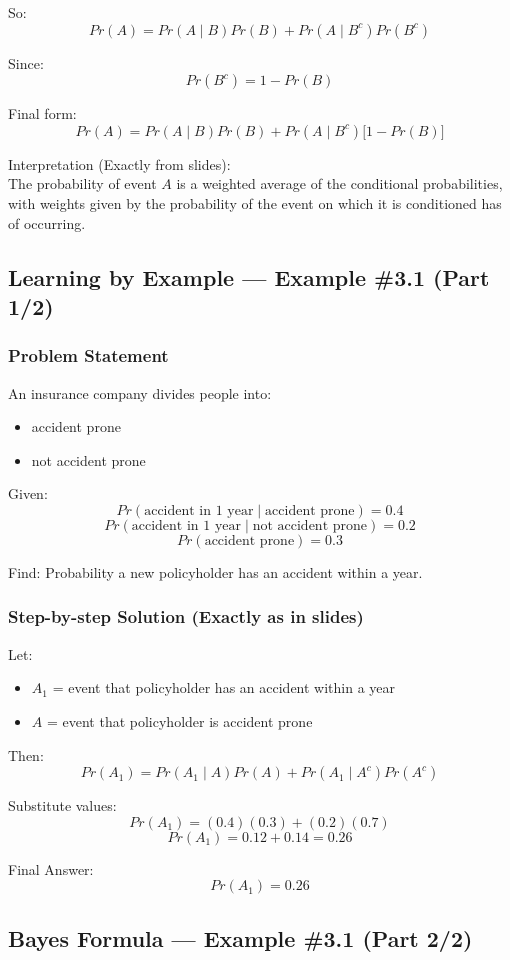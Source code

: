 \documentclass{article}
\begin{document}
So:
\[
Pr(A)=Pr(A\mid B)Pr(B)+Pr(A\mid B^c)Pr(B^c)
\]

Since:
\[
Pr(B^c)=1-Pr(B)
\]

Final form:
\[
Pr(A)=Pr(A\mid B)Pr(B)+Pr(A\mid B^c)\big[1-Pr(B)\big]
\]

Interpretation (Exactly from slides):\\
The probability of event $A$ is a weighted average of the conditional probabilities,
with weights given by the probability of the event on which it is conditioned has of occurring.

\subsection{Learning by Example --- Example \#3.1 (Part 1/2)}

\subsubsection*{Problem Statement}
An insurance company divides people into:
\begin{itemize}
\item accident prone
\item not accident prone
\end{itemize}

Given:
\[
Pr(\text{accident in 1 year}\mid \text{accident prone})=0.4
\]
\[
Pr(\text{accident in 1 year}\mid \text{not accident prone})=0.2
\]
\[
Pr(\text{accident prone})=0.3
\]

Find: Probability a new policyholder has an accident within a year.

\subsubsection*{Step-by-step Solution (Exactly as in slides)}
Let:
\begin{itemize}
\item $A_1$ = event that policyholder has an accident within a year
\item $A$ = event that policyholder is accident prone
\end{itemize}

Then:
\[
Pr(A_1)=Pr(A_1\mid A)Pr(A)+Pr(A_1\mid A^c)Pr(A^c)
\]

Substitute values:
\[
Pr(A_1)=(0.4)(0.3)+(0.2)(0.7)
\]
\[
Pr(A_1)=0.12+0.14=0.26
\]

Final Answer:
\[
Pr(A_1)=0.26
\]

\subsection{Bayes Formula --- Example \#3.1 (Part 2/2)}
\end{document}

